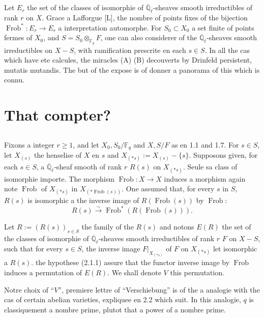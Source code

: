 \documentclass[11pt,a4paper]{article}
\theoremstyle{plain}
\theoremstyle{definition}
\DeclareMathOperator{\Frob}{Frob}
\newcommand{\F}{\mathbb{F}}
\newcommand{\Ql}{\overline{\mathbb{Q}}_\ell}
\begin{document}
\subsection{}
Let $E_r$ the set of the classes of isomorphie of $\Ql$-sheaves smooth irreductibles of rank $r$ on $X$. Grace a Lafforgue [L], the nombre of points fixes of the bijection $\Frob^*: E_r \to E_r$ a interpretation automorphe. For $S_0 \subset X_0$ a set finite of points fermes of $X_0$, and $S = S_0 \otimes_{\F_q} F$, one can also considerer of the $\Ql$-sheaves smooth irreductibles on $X - S$, with ramification prescrite en each $s \in S$. In all the cas which have ete calcules, the miracles (A) (B) decouverts by Drinfeld persistent, mutatis mutandis. The but of the expose is of donner a panorama of this which is connu.

\section{That compter?}

\subsection{}
Fixons a integer $r \geq 1$, and let $X_0, S_0/\F_q$ and $X, S/F$ as en 1.1 and 1.7. For $s \in S$, let $X_{(s)}$ the henselise of $X$ en $s$ and $X_{(*s)} := X_{(s)} - \{s\}$. Supposons given, for each $s \in S$, a $\Ql$-sheaf smooth of rank $r$ $R(s)$ on $X_{(*s)}$. Seule sa class of isomorphie importe. The morphism $\Frob: X \to X$ induces a morphism again note $\Frob$ of $X_{(*s)}$ in $X_{(*\Frob(s))}$. One assumed that, for every $s$ in $S$, $R(s)$ is isomorphic a the inverse image of $R(\Frob(s))$ by $\Frob$:
\begin{equation}
R(s) \xrightarrow{\sim} \Frob^*(R(\Frob(s))).
\tag{2.1.1}
\end{equation}

Let $R := (R(s))_{s \in S}$ the family of the $R(s)$ and notons $E(R)$ the set of the classes of isomorphie of $\Ql$-sheaves smooth irreductibles of rank $r$ $F$ on $X - S$, such that for every $s \in S$, the inverse image $F|_{X_{(*s)}}$ of $F$ on $X_{(*s)}$ let isomorphic a $R(s)$. the hypothese (2.1.1) assure that the functor inverse image by $\Frob$ induces a permutation of $E(R)$. We shall denote $V$ this permutation.

Notre choix of ``$V$'', premiere lettre of ``Verschiebung'' is of the a analogie with the cas of certain abelian varieties, expliquee en 2.2 which suit. In this analogie, $q$ is classiquement a nombre prime, plutot that a power of a nombre prime.
\end{document}
